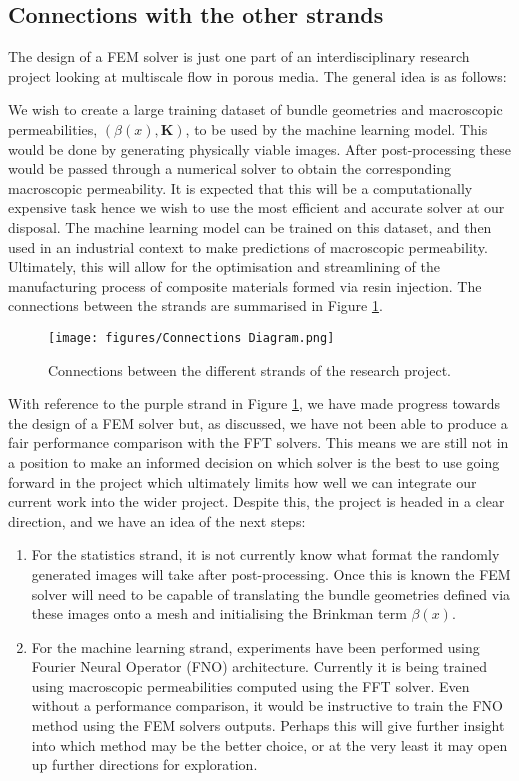 \documentclass[12pt]{article}
\theoremstyle{theorem}
\begin{document}
\subsection{Connections with the other strands}

The design of a FEM solver is just one part of an interdisciplinary research project looking at multiscale flow in porous media. The general idea is as follows:

We wish to create a large training dataset of bundle geometries and macroscopic permeabilities, $(\beta(x), \mathbf{K})$, to be used by the machine learning model. This would be done by generating physically viable images. After post-processing these would be passed through a numerical solver to obtain the corresponding macroscopic permeability. It is expected that this will be a computationally expensive task hence we wish to use the most efficient and accurate solver at our disposal. The machine learning model can be trained on this dataset, and then used in an industrial context to make predictions of macroscopic permeability. Ultimately, this will allow for the optimisation and streamlining of the manufacturing process of composite materials formed via resin injection. The connections between the strands are summarised in Figure \ref{fig: connections}.

\begin{figure}[h!]
    \centering
    \texttt{[image: figures/Connections Diagram.png]}
    \caption{Connections between the different strands of the research project.}
    \label{fig: connections}
\end{figure}

With reference to the purple strand in Figure \ref{fig: connections}, we have made progress towards the design of a FEM solver but, as discussed, we have not been able to produce a fair performance comparison with the FFT solvers. This means we are still not in a position to make an informed decision on which solver is the best to use going forward in the project which ultimately limits how well we can integrate our current work into the wider project. Despite this, the project is headed in a clear direction, and we have an idea of the next steps:

\begin{enumerate}
    \item For the statistics strand, it is not currently know what format the randomly generated images will take after post-processing. Once this is known the FEM solver will need to be capable of translating the bundle geometries defined via these images onto a mesh and initialising the Brinkman term $\beta(x)$.
    \item For the machine learning strand, experiments have been performed using Fourier Neural Operator (FNO) architecture. Currently it is being trained using macroscopic permeabilities computed using the FFT solver. Even without a performance comparison, it would be instructive to train the FNO method using the FEM solvers outputs. Perhaps this will give further insight into which method may be the better choice, or at the very least it may open up further directions for exploration.
\end{enumerate}
\end{document}
